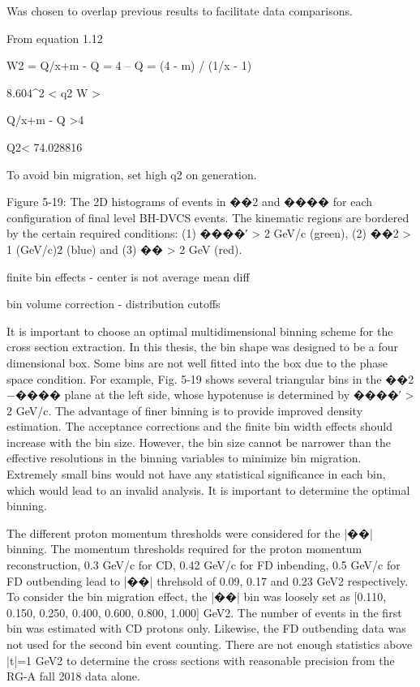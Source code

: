 Was chosen to overlap previous results \parencite{Bedlinskiy2014ExclusiveCLAS} to facilitate data comparisons. 

From equation 1.12

W2 = Q/x+m - Q = 4 -- Q = (4 - m) / (1/x - 1)

8.604^2 < q2
W >

 Q/x+m - Q >4

Q2< 74.028816





To avoid bin migration, set high q2 on generation.

\iffalse
Figure 5-19: The 2D histograms of events in ��2 and ���� for each configuration of final
level BH-DVCS events. The kinematic regions are bordered by the certain required
conditions: (1) ����′ > 2 GeV/c (green), (2) ��2 > 1 (GeV/c)2 (blue) and (3) �� > 2
GeV (red).

finite bin effects - center is not average  mean diff

bin volume correction - distribution cutoffs

It is important to choose an optimal multidimensional binning scheme for the cross
section extraction. In this thesis, the bin shape was designed to be a four dimensional
box. Some bins are not well fitted into the box due to the phase space condition. For
example, Fig. 5-19 shows several triangular bins in the ��2 −���� plane at the left side,
whose hypotenuse is determined by ����′ > 2 GeV/c.
The advantage of finer binning is to provide improved density estimation. The
acceptance corrections and the finite bin width effects should increase with the bin
size. However, the bin size cannot be narrower than the effective resolutions in the
binning variables to minimize bin migration. Extremely small bins would not have
any statistical significance in each bin, which would lead to an invalid analysis. It is
important to determine the optimal binning.


The different proton momentum thresholds were considered for the |��| binning.
The momentum thresholds required for the proton momentum reconstruction, 0.3
GeV/c for CD, 0.42 GeV/c for FD inbending, 0.5 GeV/c for FD outbending lead to
|��| threhsold of 0.09, 0.17 and 0.23 GeV2 respectively. To consider the bin migration
effect, the |��| bin was loosely set as [0.110, 0.150, 0.250, 0.400, 0.600, 0.800, 1.000]
GeV2. The number of events in the first bin was estimated with CD protons only.
Likewise, the FD outbending data was not used for the second bin event counting.
There are not enough statistics above |t|=1 GeV2 to determine the cross sections with
reasonable precision from the RG-A fall 2018 data alone.


